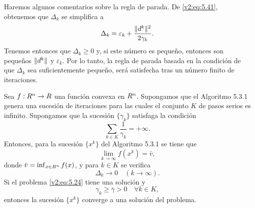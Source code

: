 Haremos algunos comentarios sobre la regla de parada. De \eqref{v2:eq:5.41}, obtenemos que $\Delta_k$ se simplifica a
\begin{equation}
    \Delta_k = \varepsilon_k + \frac{\lVert d^k\rVert^2}{2\gamma_k}.
    \label{v2:eq:5.54}
\end{equation}
Tenemos entonces que $\Delta_k \ge 0$ y, si este número es pequeño, entonces son pequeños $\lVert d^k\rVert$ y $\varepsilon_k$. Por lo tanto, la regla de parada basada en la condición de que $\Delta_k$ sea suficientemente pequeño, será satisfecha tras un número finito de iteraciones. 

\begin{theorem}\label{v2:thm:5.3.1}
    Sea $f : R^n \to R$ una función convexa en $R^n$. Supongamos que el Algoritmo 5.3.1 genera una sucesión de iteraciones para las cuales el conjunto $K$ de pasos serios es infinito. Supongamos que la sucesión $\{\gamma_k\}$ satisfaga la condición
    \begin{equation}
        \sum_{k \in K} \frac{1}{\gamma_k} = +\infty.
        \label{v2:eq:5.55}
    \end{equation}
    Entonces, para la sucesión $\{x^k\}$ del Algoritmo 5.3.1 se tiene que
    \begin{equation}
        \lim_{k \to \infty} f(x^k) = \bar{v},
        \label{v2:eq:5.56}
    \end{equation}
    donde $\bar{v} = \inf_{x \in R^n} f(x)$, y para $k \in K$ se verifica
    \begin{equation}
        \Delta_k \to 0 \quad (k \to \infty).
        \label{v2:eq:5.57}
    \end{equation}
    Si el problema \eqref{v2:eq:5.24} tiene una solución y
    \begin{equation}
        \gamma_k \ge \bar{\gamma} > 0 \quad \forall k \in K,
        \label{v2:eq:5.58}
    \end{equation}
    entonces la sucesión $\{x^k\}$ converge a una solución del problema.
\end{theorem}

